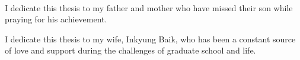 \begin{center}
\\
\end{center}
\vspace*{\fill}
\begin{center}
\noindent I dedicate this thesis to my father and mother who have missed their son while praying for his achievement.
\end{center}
\begin{center}
\noindent I dedicate this thesis to my wife, Inkyung Baik, who has been a constant source of love and support during the challenges of graduate school and life.
\end{center}
\vspace*{\fill}
